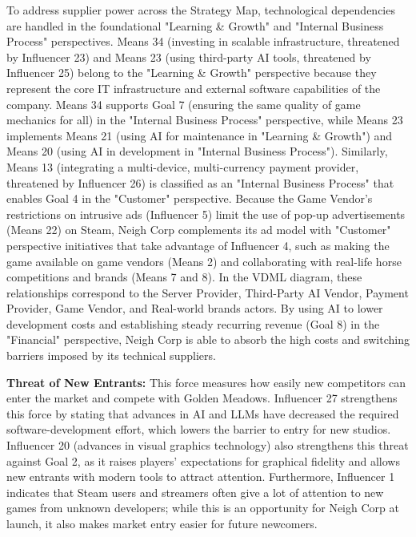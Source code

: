 \documentclass{article}
\begin{document}
To address supplier power across the Strategy Map, technological dependencies are handled in the foundational "Learning \& Growth" and "Internal Business Process" perspectives. Means 34 (investing in scalable infrastructure, threatened by Influencer 23) and Means 23 (using third-party AI tools, threatened by Influencer 25) belong to the "Learning \& Growth" perspective because they represent the core IT infrastructure and external software capabilities of the company. Means 34 supports Goal 7 (ensuring the same quality of game mechanics for all) in the "Internal Business Process" perspective, while Means 23 implements Means 21 (using AI for maintenance in "Learning \& Growth") and Means 20 (using AI in development in "Internal Business Process"). Similarly, Means 13 (integrating a multi-device, multi-currency payment provider, threatened by Influencer 26) is classified as an "Internal Business Process" that enables Goal 4 in the "Customer" perspective. Because the Game Vendor's restrictions on intrusive ads (Influencer 5) limit the use of pop-up advertisements (Means 22) on Steam, Neigh Corp complements its ad model with "Customer" perspective initiatives that take advantage of Influencer 4, such as making the game available on game vendors (Means 2) and collaborating with real-life horse competitions and brands (Means 7 and 8). In the VDML diagram, these relationships correspond to the Server Provider, Third-Party AI Vendor, Payment Provider, Game Vendor, and Real-world brands actors. By using AI to lower development costs and establishing steady recurring revenue (Goal 8) in the "Financial" perspective, Neigh Corp is able to absorb the high costs and switching barriers imposed by its technical suppliers.

\textbf{Threat of New Entrants:}
This force measures how easily new competitors can enter the market and compete with Golden Meadows. Influencer 27 strengthens this force by stating that advances in AI and LLMs have decreased the required software-development effort, which lowers the barrier to entry for new studios. Influencer 20 (advances in visual graphics technology) also strengthens this threat against Goal 2, as it raises players' expectations for graphical fidelity and allows new entrants with modern tools to attract attention. Furthermore, Influencer 1 indicates that Steam users and streamers often give a lot of attention to new games from unknown developers; while this is an opportunity for Neigh Corp at launch, it also makes market entry easier for future newcomers.
\end{document}
